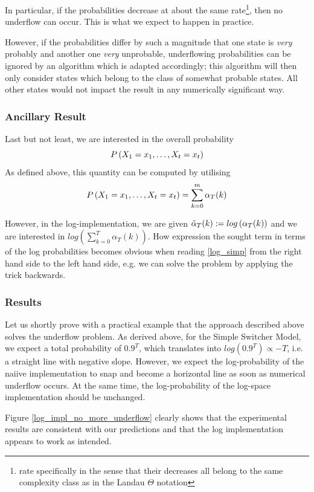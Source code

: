 In particular, if the probabilities decrease at about the same rate\footnote{rate specifically in the sense that their decreases all belong to the same complexity class as in the Landau $\Theta$ notation}, then no underflow can occur. This is what we expect to happen in practice. 

However, if the probabilities differ by such a magnitude that one state is \textit{very} probably and another one \textit{very} unprobable, underflowing probabilities can be ignored by an algorithm which is adapted accordingly; this algorithm will then only consider states which belong to the class of somewhat probable states. All other states would not impact the result in any numerically significant way. 


\subsubsection*{Ancillary Result}
Last but not least, we are interested in the overall probability
\[
	P \left(X_1 = x_1, \dots, X_t = x_t\right)
\] 
As defined above, this quantity can be computed by utilising
\[
P \left(X_1 = x_1, \dots, X_t = x_t\right) = \sum\limits_{k=0}^m \alpha_T(k)
\]

However, in the log-implementation, we are given $\tilde{\alpha}_{T}(k) := log\left(\alpha_T(k)\right)$ and we are interested in $log\left(\sum\limits_{k=0}^T \alpha_T(k) \right)$. How expression the sought term in terms of the log probabilities becomes obvious when reading \ref{log_simp} from the right hand side to the left hand side, e.g. we can solve the problem by applying the trick backwards. 


\subsubsection{Results}
Let us shortly prove with a practical example that the approach described above solves the underflow problem. 
As derived above, for the Simple Switcher Model, we expect a total probability of $0.9^T$, which translates into $log\left(0.9^T\right) \propto -T$, i.e. a straight line with negative slope. However, we expect the log-probability of the naiive implementation to snap and become a horizontal line as soon as numerical underflow occurs. At the same time, the log-probability of the log-space implementation should be unchanged. 

Figure \ref{log_impl_no_more_underflow} clearly shows that the experimental results are consistent with our predictions and that the log implementation appears to work as intended.


